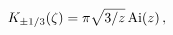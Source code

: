 \[\mathop{K_{\pm 1/3}\/}\nolimits\!\left(\zeta\right)=\pi\sqrt{3/z}\mathop{%
\mathrm{Ai}\/}\nolimits\!\left(z\right),\]